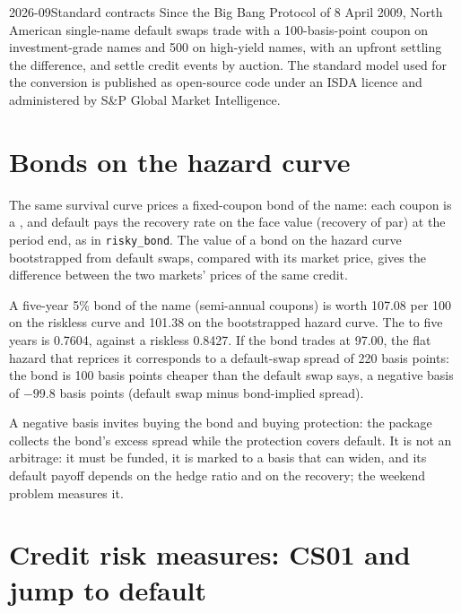 \begin{dated}{2026-09}{Standard contracts}\label{dat:rc:reduced-form-credit:standard}
Since the Big Bang Protocol of 8 April 2009, North American single-name default swaps
trade with a 100-basis-point coupon on investment-grade names and 500 on high-yield
names, with an upfront settling the difference, and settle credit events by auction.
The standard model used for the conversion is published as open-source code under an
ISDA licence and administered by S\&P Global Market Intelligence.
\end{dated}

\section{Bonds on the hazard curve}

The same survival curve prices a fixed-coupon bond of the name: each coupon is a
, and default pays the recovery rate on the face value (recovery
of par) at the period end, as in \texttt{risky\_bond}. The value of a bond on the hazard
curve bootstrapped from default swaps, compared with its market price, gives the
difference between the two markets' prices of the same credit.

\begin{example}\label{ex:rc:reduced-form-credit:bond}
A five-year 5\% bond of the name (semi-annual coupons) is worth 107.08 per 100 on the
riskless curve and 101.38 on the bootstrapped hazard curve. The  to
five years is 0.7604, against a riskless 0.8427. If the bond trades at 97.00, the flat
hazard that reprices it corresponds to a default-swap spread of 220 basis points: the
bond is 100 basis points cheaper than the default swap says, a negative basis of
$-99.8$ basis points (default swap minus bond-implied spread).
\end{example}

A negative basis invites buying the bond and buying protection: the package collects
the bond's excess spread while the protection covers default. It is not an arbitrage: it
must be funded, it is marked to a basis that can widen, and its default payoff depends
on the hedge ratio and on the recovery; the weekend problem measures it.

\section{Credit risk measures: CS01 and jump to default}

